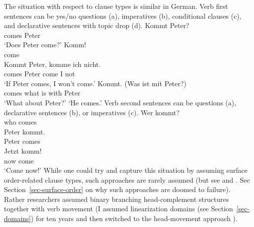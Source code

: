 \documentclass[output=paper]{langsci/langscibook}
\begin{document}
The situation with respect to clause types is similar in German. Verb first sentences can be yes/no
questions (a), imperatives (b), conditional clauses (c), and declarative
sentences with topic drop (d). 
\eal
\ex 
\gll Kommt Peter?\\
     comes Peter\\\german
\glt `Does Peter come?'
\ex 
\gll Komm!\\
     come\\
\ex 
\gll Kommt Peter, komme ich nicht.\\
     comes Peter  come  I not\\
\glt `If Peter comes, I won't come.'
\ex 
\gll Kommt. (Was ist mit Peter?)\\
     comes  what is with Peter\\
\glt `What about Peter?' `He comes.'
\zl
Verb second sentences can be questions (a), declarative sentences (b), or imperatives (c).
\eal
\ex 
\gll Wer kommt?\\
     who comes\\
\ex 
\gll Peter kommt.\\
     Peter comes\\\german
\ex 
\gll Jetzt komm!\\
     now   come\\
\glt `Come now!'
\zl
While one could try and capture this situation by assuming surface order-related clause types, such approaches are rarely
assumed (but see  and . See Section~\ref{sec-surface-order} on why such approaches
are doomed to failure). Rather researchers assumed binary branching head-complement structures
together with verb movement (I assumed linearization domains (see Section~\ref{sec-domains}) for ten
years and then switched to the head-movement approach \citep{Mueller2005c,Mueller2005d,MuellerGS}). 
\end{document}
